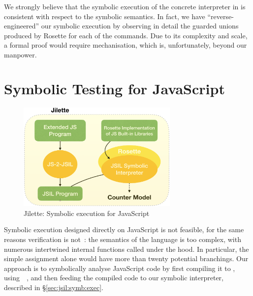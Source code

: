 We strongly believe that the symbolic execution of the concrete interpreter 
in \rosette is consistent with respect to the \jsil symbolic semantics. 
In fact, we have ``reverse-engineered'' our \jsil symbolic execution by 
observing in detail the guarded unions produced by Rosette for each of 
the \jsil commands. Due to its complexity and scale, 
{a formal proof would require
mechanisation}, which is, unfortunately, beyond our manpower.
 


\section{Symbolic Testing for JavaScript}
\label{sec:sym:exec:js}

\begin{figure}[t]
\centering
\includegraphics[width=0.7\textwidth]{figures/jilette.png}
\vspace*{-0.3cm}
\caption{Jilette: Symbolic execution for JavaScript}
\vspace*{-0.3cm}
\label{fig:jilette:diagram}
\end{figure}

Symbolic execution designed directly on JavaScript is not feasible, for the same reasons verification is not~\cite{JoseCADE}: the semantics of the language is too complex, with numerous intertwined internal functions called under the hood. In particular, the simple assignment alone would have more than twenty potential branchings. Our approach is to symbolically analyse JavaScript code by first compiling it to \jsil, using~\JSComp~\cite{javert}, and then feeding the compiled \jsil code to our \jsil symbolic interpreter, described in \S\ref{sec:jsil:symb:exec}.

